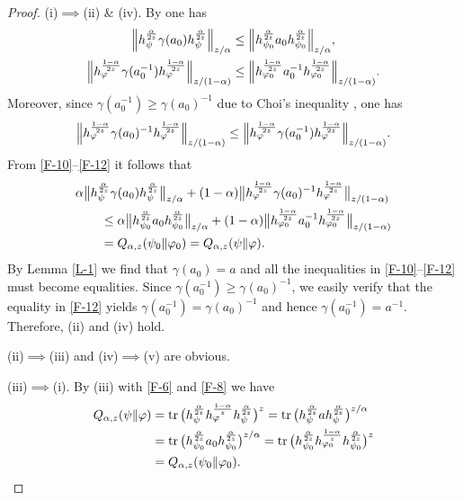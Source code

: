 \documentclass[11pt,reqno]{article}
\numberwithin{equation}{section}
\def\tr{\mathrm{tr}\,}
\def\ffi{\varphi}
\begin{document}
\begin{proof}
(i)$\implies$(ii) \& (iv).\enspace
By \cite[(22)]{Ka1} one has
\begin{align}
\Big\|h_\psi^{\alpha\over2z}\gamma(a_0)h_\psi^{\alpha\over2z}\Big\|_{z/\alpha}
&\le\Big\|h_{\psi_0}^{\alpha\over2z}a_0h_{\psi_0}^{\alpha\over2z}\Big\|_{z/\alpha}, \label{F-10}\\
\Big\|h_\ffi^{1-\alpha\over2z}\gamma(a_0^{-1})h_\ffi^{1-\alpha\over2z}\Big\|_{z/(1-\alpha)}
&\le\Big\|h_{\ffi_0}^{1-\alpha\over2z}a_0^{-1}h_{\ffi_0}^{1-\alpha\over2z}\Big\|_{z/(1-\alpha)}. \label{F-11}
\end{align}
Moreover, since $\gamma(a_0^{-1})\ge\gamma(a_0)^{-1}$ due to Choi's inequality \cite[Corollary 2.3]{Ch},
one has
\begin{align}\label{F-12}
\Big\|h_\ffi^{1-\alpha\over2z}\gamma(a_0)^{-1}h_\ffi^{1-\alpha\over2z}\Big\|_{z/(1-\alpha)}
\le\Big\|h_\ffi^{1-\alpha\over2z}\gamma(a_0^{-1})h_\ffi^{1-\alpha\over2z}\Big\|_{z/(1-\alpha)}.
\end{align}
From \eqref{F-10}--\eqref{F-12} it follows that
\begin{align*}
&\alpha\big\|h_\psi^{\alpha\over2z}\gamma(a_0)h_\psi^{\alpha\over2z}\big\|_{z/\alpha}
+(1-\alpha)\big\|h_\ffi^{1-\alpha\over2z}\gamma(a_0)^{-1}h_\ffi^{1-\alpha\over2z}\big\|_{z/(1-\alpha)} \\
&\qquad\le\alpha\big\|h_{\psi_0}^{\alpha\over2z}a_0h_{\psi_0}^{\alpha\over2z}\big\|_{z/\alpha}
+(1-\alpha)\big\|h_{\ffi_0}^{1-\alpha\over2z}a_0^{-1}h_{\ffi_0}^{1-\alpha\over2z}\big\|_{z/(1-\alpha)} \\
&\qquad=Q_{\alpha,z}(\psi_0\|\ffi_0)=Q_{\alpha,z}(\psi\|\ffi).
\end{align*}
By Lemma \ref{L-1} we find that $\gamma(a_0)=a$ and all the inequalities in \eqref{F-10}--\eqref{F-12} must
become equalities. Since $\gamma(a_0^{-1})\ge\gamma(a_0)^{-1}$, we easily verify that the equality in
\eqref{F-12} yields $\gamma(a_0^{-1})=\gamma(a_0)^{-1}$ and hence $\gamma(a_0^{-1})=a^{-1}$. Therefore,
(ii) and (iv) hold.

(ii)$\implies$(iii) and (iv)$\implies$(v) are obvious.

(iii)$\implies$(i).\enspace
By (iii) with \eqref{F-6} and \eqref{F-8} we have
\begin{align*}
Q_{\alpha,z}(\psi\|\ffi)
&=\tr\bigl(h_\psi^{\alpha\over2z}h_\ffi^{1-\alpha\over z}h_\psi^{\alpha\over2z}\bigr)^z
=\tr\bigl(h_\psi^{\alpha\over2z}ah_\psi^{\alpha\over2z}\bigr)^{z/\alpha} \\
&=\tr\bigl(h_{\psi_0}^{\alpha\over2z}a_0h_{\psi_0}^{\alpha\over2z}\bigr)^{z/\alpha}
=\tr\bigl(h_{\psi_0}^{\alpha\over2z}h_{\ffi_0}^{1-\alpha\over z}h_{\psi_0}^{\alpha\over2z}\bigr)^z \\
&=Q_{\alpha,z}(\psi_0\|\ffi_0).
\end{align*}


\end{proof}
\end{document}
